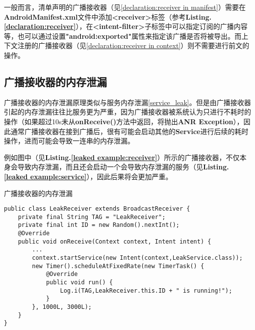 一般而言，清单声明的广播接收器（见\ref{declaration:receiver in manifest}）需要在\textbf{AndroidManifest.xml}文件中添加\textbf{<receiver>}标签（参考\textbf{Listing.\textcolor{red}{\ref{declaration:receiver}}}），在\textbf{<intent-filter>}子标签中可以指定订阅的广播内容等，也可以通过设置\textbf{"android:exported"}属性来指定该广播是否将被导出。而上下文注册的广播接收器（见\ref{declaration:receiver in context}）则不需要进行前文的操作。
\subsection{广播接收器的内存泄漏}
广播接收器的内存泄漏原理类似与服务内存泄漏\ref{service_leak}。但是由广播接收器引起的内存泄漏往往比服务更为严重，因为广播接收器被系统认为只进行不耗时的操作（如果超过10s未从\textbf{onReceive()}方法中返回，将抛出\textbf{ANR Exception}），因此通常广播接收器在接到广播后，很有可能会启动其他的\textbf{Service}进行后续的耗时操作，进而可能会导致一连串的内存泄漏。

例如图中（见\textbf{Listing.\textcolor{red}{\ref{leaked example:receiver}}}）所示的广播接收器，不仅本身会导致内存泄漏，而且还会启动一个会导致内存泄漏的服务（见\textbf{Listing.\textcolor{red}{\ref{leaked example:service}}}），因此后果将会更加严重。
\begin{listing}[htbp]
	\centering
	\caption{广播接收器的内存泄漏}
	\begin{verbatim}
public class LeakReceiver extends BroadcastReceiver {
	private final String TAG = "LeakReceiver";
	private final int ID = new Random().nextInt();
	@Override
	public void onReceive(Context context, Intent intent) {
		...
		context.startService(new Intent(context,LeakService.class));
		new Timer().scheduleAtFixedRate(new TimerTask() {
			@Override
			public void run() {
				Log.i(TAG,LeakReceiver.this.ID + " is running!");
			}
		}, 1000L, 3000L);
	}
}
	\end{verbatim}
	\label{leaked example:receiver}
\end{listing}
